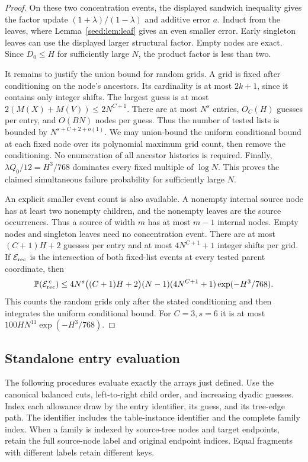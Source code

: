\documentclass[11pt]{article}
\theoremstyle{definition}
\newcommand{\Prb}{\mathbb P}
\newcommand{\1}{\mathbf 1}
\begin{document}
\begin{proof}
On these two concentration events, the displayed sandwich inequality gives the factor
update $(1+\lambda)/(1-\lambda)$ and additive error $a$. Induct from the
leaves, where Lemma~\ref{seed:lem:leaf} gives an even smaller error. Early
singleton leaves can use the displayed larger structural factor. Empty
nodes are exact. Since $D_0\le H$ for sufficiently large $N$, the product
factor is less than two.

It remains to justify the union bound for random grids. A grid is fixed
after conditioning on the node's ancestors. Its cardinality is at most
$2k+1$, since it contains only integer shifts. The largest guess is at
most $2(M(X)+M(V))\le2N^{C+1}$. There are at most $N^s$ entries,
$O_C(H)$ guesses per entry, and $O(BN)$ nodes per guess. Thus the number
of tested lists is bounded by $N^{s+C+2+o(1)}$. We may union-bound the
uniform conditional bound at each fixed node over its polynomial maximum
grid count, then remove the conditioning. No enumeration of all ancestor
histories is required. Finally,
$\lambda Q_0/12=H^3/768$ dominates every fixed multiple of $\log N$.
This proves the claimed simultaneous failure probability for sufficiently
large $N$.

An explicit smaller event count is also available. A nonempty internal
source node has at least two nonempty children, and the nonempty leaves
are the source occurrences. Thus a source of width $m$ has at most $m-1$
internal nodes. Empty nodes and singleton leaves need no concentration
event. There are at most $(C+1)H+2$ guesses per entry and at most
$4N^{C+1}+1$ integer shifts per grid. If $\mathcal E_{\rm rec}$ is the
intersection of both fixed-list events at every tested parent coordinate,
then
\[
 \Prb(\mathcal E_{\rm rec}^{\,c})
 \le4N^s\bigl((C+1)H+2\bigr)(N-1)(4N^{C+1}+1)
       \exp(-H^3/768).
\]
This counts the random grids only after the stated conditioning and then
integrates the uniform conditional bound. For $C=3,s=6$ it is at most
$100HN^{11}\exp(-H^3/768)$.
\end{proof}

\subsection{Standalone entry evaluation}

The following procedures evaluate exactly the arrays just defined.
Use the canonical balanced cuts, left-to-right child order, and increasing
dyadic guesses. Index each allowance draw by the entry identifier, its
guess, and its tree-edge path. The identifier includes the table-instance
identifier and the complete family index. When a family is indexed by
source-tree nodes and target endpoints, retain the full source-node label
and original endpoint indices. Equal fragments with different labels
retain different keys.
\end{document}
